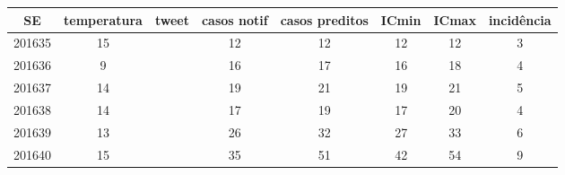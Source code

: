 \begin{tabular}{c|ccccccc}
  \hline
SE & temperatura & tweet & casos notif & casos preditos & ICmin & ICmax & incidência \\ 
  \hline
201635 & 15 &  & 12 & 12 & 12 & 12 & 3 \\ 
  201636 & 9 &  & 16 & 17 & 16 & 18 & 4 \\ 
  201637 & 14 &  & 19 & 21 & 19 & 21 & 5 \\ 
  201638 & 14 &  & 17 & 19 & 17 & 20 & 4 \\ 
  201639 & 13 &  & 26 & 32 & 27 & 33 & 6 \\ 
  201640 & 15 &  & 35 & 51 & 42 & 54 & 9 \\ 
   \hline
\end{tabular}
